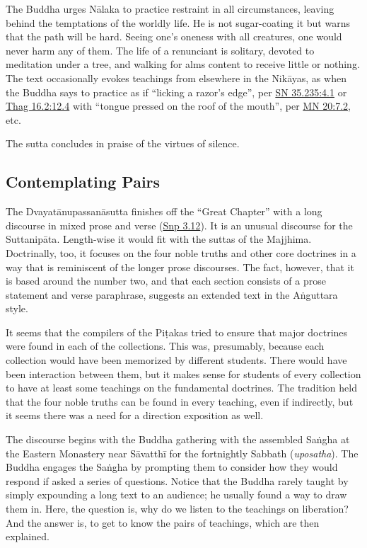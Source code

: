 \documentclass[12pt,openany]{book}%
\begin{document}
The Buddha urges \textsanskrit{Nālaka} to practice restraint in all circumstances, leaving behind the temptations of the worldly life. He is not sugar-coating it but warns that the path will be hard. Seeing one’s oneness with all creatures, one would never harm any of them. The life of a renunciant is solitary, devoted to meditation under a tree, and walking for alms content to receive little or nothing. The text occasionally evokes teachings from elsewhere in the \textsanskrit{Nikāyas}, as when the Buddha says to practice as if “licking a razor’s edge”, per \href{https://suttacentral.net/sn35.235/en/sujato\#4.1}{SN 35.235:4.1} or \href{https://suttacentral.net/thag16.2/en/sujato\#12.4}{Thag 16.2:12.4} with “tongue pressed on the roof of the mouth”, per \href{https://suttacentral.net/mn20/en/sujato\#7.2}{MN 20:7.2}, etc.

The sutta concludes in praise of the virtues of silence.

\subsection*{Contemplating Pairs}

The \textsanskrit{Dvayatānupassanāsutta} finishes off the “Great Chapter” with a long discourse in mixed prose and verse (\href{https://suttacentral.net/snp3.12/en/sujato}{Snp 3.12}). It is an unusual discourse for the \textsanskrit{Suttanipāta}. Length-wise it would fit with the suttas of the Majjhima. Doctrinally, too, it focuses on the four noble truths and other core doctrines in a way that is reminiscent of the longer prose discourses. The fact, however, that it is based around the number two, and that each section consists of a prose statement and verse paraphrase, suggests an extended text in the \textsanskrit{Aṅguttara} style.

It seems that the compilers of the \textsanskrit{Piṭakas} tried to ensure that major doctrines were found in each of the collections. This was, presumably, because each collection would have been memorized by different students. There would have been interaction between them, but it makes sense for students of every collection to have at least some teachings on the fundamental doctrines. The tradition held that the four noble truths can be found in every teaching, even if indirectly, but it seems there was a need for a direction exposition as well.

The discourse begins with the Buddha gathering with the assembled \textsanskrit{Saṅgha} at the Eastern Monastery near \textsanskrit{Sāvatthī} for the fortnightly Sabbath (\textit{uposatha}). The Buddha engages the \textsanskrit{Saṅgha} by prompting them to consider how they would respond if asked a series of questions. Notice that the Buddha rarely taught by simply expounding a long text to an audience; he usually found a way to draw them in. Here, the question is, why do we listen to the teachings on liberation? And the answer is, to get to know the pairs of teachings, which are then explained.
\end{document}
